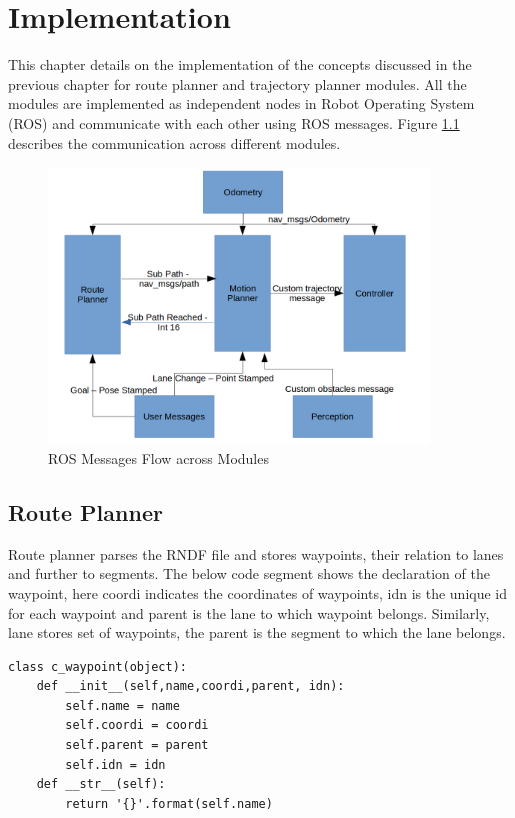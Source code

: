 \chapter{Implementation}
\label{implementation}
This chapter details on the implementation of the concepts discussed in the previous chapter for route planner and trajectory planner modules. All the modules are implemented as independent nodes in Robot Operating System (ROS) and communicate with each other using ROS messages. Figure \ref{message_flow} describes the communication across different modules. 

\begin{figure}[H]
	\centering
	\includegraphics[width=0.9\textwidth]{Images/implementation/message_flow.png}
	\caption{ROS Messages Flow across Modules}
	\label{message_flow}
\end{figure}


\section{Route Planner}
Route planner parses the RNDF file and stores waypoints, their relation to lanes and further to segments. The below code segment shows the declaration of the waypoint, here coordi indicates the coordinates of waypoints, idn is the unique id for each waypoint and parent is the lane to which waypoint belongs. Similarly, lane stores set of waypoints, the parent is the segment to which the lane belongs. 

\begin{lstlisting}
class c_waypoint(object):
	def __init__(self,name,coordi,parent, idn):
		self.name = name
		self.coordi = coordi
		self.parent = parent
		self.idn = idn
	def __str__(self):
		return '{}'.format(self.name)

\end{lstlisting}

